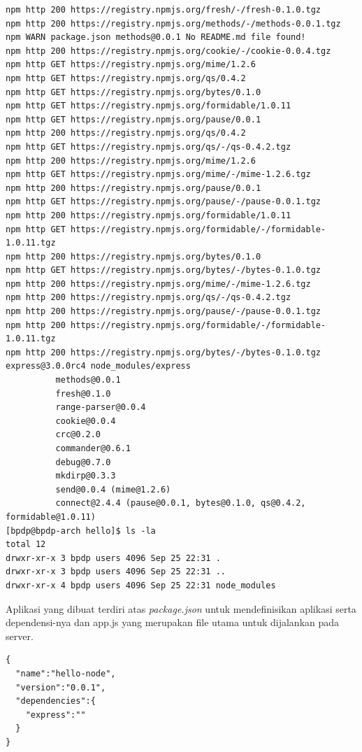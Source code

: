 \begin{lstlisting}
npm http 200 https://registry.npmjs.org/fresh/-/fresh-0.1.0.tgz 
npm http 200 https://registry.npmjs.org/methods/-/methods-0.0.1.tgz 
npm WARN package.json methods@0.0.1 No README.md file found! 
npm http 200 https://registry.npmjs.org/cookie/-/cookie-0.0.4.tgz 
npm http GET https://registry.npmjs.org/mime/1.2.6 
npm http GET https://registry.npmjs.org/qs/0.4.2 
npm http GET https://registry.npmjs.org/bytes/0.1.0 
npm http GET https://registry.npmjs.org/formidable/1.0.11 
npm http GET https://registry.npmjs.org/pause/0.0.1 
npm http 200 https://registry.npmjs.org/qs/0.4.2 
npm http GET https://registry.npmjs.org/qs/-/qs-0.4.2.tgz 
npm http 200 https://registry.npmjs.org/mime/1.2.6 
npm http GET https://registry.npmjs.org/mime/-/mime-1.2.6.tgz 
npm http 200 https://registry.npmjs.org/pause/0.0.1 
npm http GET https://registry.npmjs.org/pause/-/pause-0.0.1.tgz 
npm http 200 https://registry.npmjs.org/formidable/1.0.11 
npm http GET https://registry.npmjs.org/formidable/-/formidable-1.0.11.tgz 
npm http 200 https://registry.npmjs.org/bytes/0.1.0 
npm http GET https://registry.npmjs.org/bytes/-/bytes-0.1.0.tgz 
npm http 200 https://registry.npmjs.org/mime/-/mime-1.2.6.tgz 
npm http 200 https://registry.npmjs.org/qs/-/qs-0.4.2.tgz 
npm http 200 https://registry.npmjs.org/pause/-/pause-0.0.1.tgz 
npm http 200 https://registry.npmjs.org/formidable/-/formidable-1.0.11.tgz 
npm http 200 https://registry.npmjs.org/bytes/-/bytes-0.1.0.tgz 
express@3.0.0rc4 node_modules/express 
          methods@0.0.1 
          fresh@0.1.0 
          range-parser@0.0.4 
          cookie@0.0.4 
          crc@0.2.0 
          commander@0.6.1 
          debug@0.7.0 
          mkdirp@0.3.3 
          send@0.0.4 (mime@1.2.6) 
          connect@2.4.4 (pause@0.0.1, bytes@0.1.0, qs@0.4.2, formidable@1.0.11) 
[bpdp@bpdp-arch hello]$ ls -la 
total 12 
drwxr-xr-x 3 bpdp users 4096 Sep 25 22:31 . 
drwxr-xr-x 3 bpdp users 4096 Sep 25 22:31 .. 
drwxr-xr-x 4 bpdp users 4096 Sep 25 22:31 node_modules 
\end{lstlisting}

Aplikasi yang dibuat terdiri atas \textit{package.json} untuk mendefinisikan aplikasi serta dependensi-nya dan app.js yang merupakan file utama untuk dijalankan pada server.

\lstset{language=Javascript,caption=package.json untuk ExpressJS}
\begin{lstlisting}
{ 
  "name":"hello-node", 
  "version":"0.0.1", 
  "dependencies":{ 
    "express":"" 
  } 
} 
\end{lstlisting}

